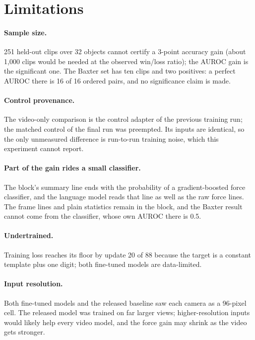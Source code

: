 \documentclass{article}
\begin{document}
\section{Limitations}

\paragraph{Sample size.} 251 held-out clips over 32 objects cannot certify a 3-point accuracy
gain (about 1{,}000 clips would be needed at the observed win/loss ratio); the AUROC gain is the
significant one. The Baxter set has ten clips and two positives: a perfect AUROC there is 16 of 16
ordered pairs, and no significance claim is made.

\paragraph{Control provenance.} The video-only comparison is the control adapter of the previous
training run; the matched control of the final run was preempted. Its inputs are identical, so
the only unmeasured difference is run-to-run training noise, which this experiment cannot report.

\paragraph{Part of the gain rides a small classifier.} The block's summary line ends with the
probability of a gradient-boosted force classifier, and the language model reads that line as well
as the raw force lines. The frame lines and plain statistics remain in the block, and the Baxter
result cannot come from the classifier, whose own AUROC there is 0.5.

\paragraph{Undertrained.} Training loss reaches its floor by update 20 of 88 because the target is
a constant template plus one digit; both fine-tuned models are data-limited.

\paragraph{Input resolution.} Both fine-tuned models and the released baseline saw each camera as
a 96-pixel cell. The released model was trained on far larger views; higher-resolution inputs
would likely help every video model, and the force gain may shrink as the video gets stronger.
\end{document}
